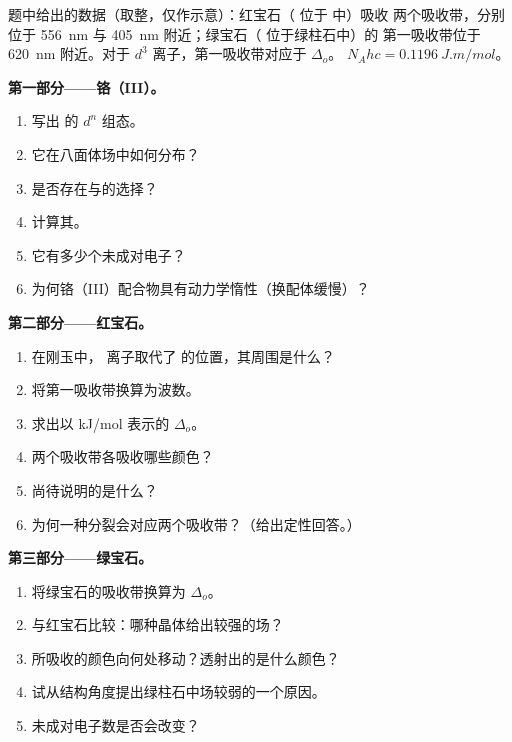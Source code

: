 \begin{problem}
\label{pb:b2:ligand-field:1}
题中给出的数据（取整，仅作示意）：红宝石（ 位于  中）吸收
两个吸收带，分别位于 \qty{556}{nm} 与 \qty{405}{nm} 附近；绿宝石（ 位于绿柱石中）的
第一吸收带位于 \qty{620}{nm} 附近。对于 $d^3$ 离子，第一吸收带对应于
$\Delta_o$。 $N_Ahc = \qty{0.1196}{J.m/mol}$。

\medskip
\noindent\textbf{第一部分——铬（III）。}
\begin{enumerate}
  \item 写出  的 $d^n$ 组态。
  \item 它在八面体场中如何分布？
  \item 是否存在与的选择？
  \item 计算其。
  \item 它有多少个未成对电子？
  \item 为何铬（III）配合物具有动力学惰性（换配体缓慢）？
\end{enumerate}

\medskip
\noindent\textbf{第二部分——红宝石。}
\begin{enumerate}[resume]
  \item 在刚玉中， 离子取代了  的位置，其周围是什么？
  \item 将第一吸收带换算为波数。
  \item 求出以 \unit{kJ/mol} 表示的 $\Delta_o$。
  \item 两个吸收带各吸收哪些颜色？
  \item 尚待说明的是什么？
  \item 为何一种分裂会对应两个吸收带？（给出定性回答。）
\end{enumerate}

\medskip
\noindent\textbf{第三部分——绿宝石。}
\begin{enumerate}[resume]
  \item 将绿宝石的吸收带换算为 $\Delta_o$。
  \item 与红宝石比较：哪种晶体给出较强的场？
  \item 所吸收的颜色向何处移动？透射出的是什么颜色？
  \item 试从结构角度提出绿柱石中场较弱的一个原因。
  \item 未成对电子数是否会改变？
\end{enumerate}


\end{problem}
